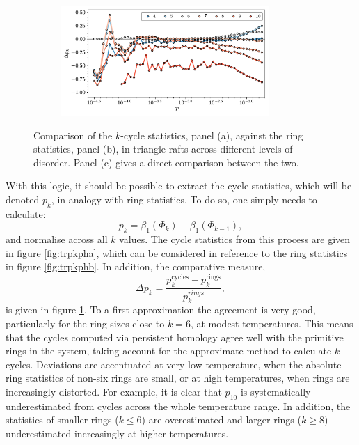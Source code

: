 \begin{figure}[tb]
     \vspace{2mm}     
      \begin{subfigure}[b]{0.96\textwidth}
         \centering
         \includegraphics[width=0.87\textwidth]{./figures/ph/tr_delta_pk.pdf}
         \caption{}
         \label{fig:trpkphc}
     \end{subfigure}

	\caption{Comparison of the $k$\--cycle statistics, panel (a), against the ring statistics, panel (b), in triangle rafts across different levels of disorder. Panel (c) gives a direct comparison between the two.}
	\label{fig:trpkph}
\end{figure}


With this logic, it should be possible to extract the cycle statistics, which will be denoted $p_k$, in analogy with ring statistics.
To do so, one simply needs to calculate:
\begin{equation}
	p_k = \beta_1\left(\Phi_k\right)-\beta_1\left(\Phi_{k-1}\right),
\end{equation}
and normalise across all $k$ values.
The cycle statistics from this process are given in figure \ref{fig:trpkpha}, which can be considered in reference to the ring statistics in figure \ref{fig:trpkphb}.
In addition, the comparative measure,
\begin{equation}
	\Delta p_k = \frac{p_k^\text{cycles}-p_k^\text{rings}}{p_k^{rings}},
\end{equation}
is given in figure \ref{fig:trpkphc}.
To a first approximation the agreement is very good, particularly for the ring sizes close to $k=6$, at modest temperatures.
This means that the cycles computed via persistent homology agree well with the primitive rings in the system, taking account for the approximate method to calculate $k$\--cycles.
Deviations are accentuated at very low temperature, when the absolute ring statistics of non\--six rings are small, or at high temperatures, when rings are increasingly distorted.
For example, it is clear that $p_{10}$ is systematically underestimated from cycles across the whole temperature range.
In addition, the statistics of smaller rings ($k\leq6$) are overestimated and larger rings ($k\geq 8$) underestimated increasingly at higher temperatures.

